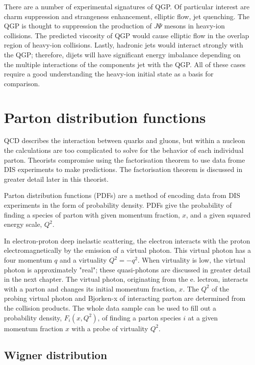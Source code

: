 There are a number of experimental signatures of QGP. Of particular interest are charm suppression and strangeness enhancement, elliptic flow, jet quenching. The QGP is thought to suppression the production of $J\Psi$ mesons in heavy-ion collisions. The predicted viscosity of QGP would cause elliptic flow in the overlap region of heavy-ion collisions. Lastly, hadronic jets would interact strongly with the QGP; therefore, dijets will have significant energy imbalance depending on the multiple interactions of the components jet with the QGP. All of these cases require a good understanding the heavy-ion initial state as a basis for comparison. 

\section{Parton distribution functions}

QCD describes the interaction between quarks and gluons, but within a nucleon the calculations are too complicated to solve for the behavior of each individual parton. Theorists compromise using the factorisation theorem to use data frome DIS experiments to make predictions. The factorisation theorem is discussed in greater detail later in this theorist.

Parton distribution functions (PDFs) are a method of encoding data from DIS experiments in the form of probability density. PDFs give the probability of finding a species of parton with given momentum fraction, $x$, and a given squared energy scale, $Q^2$.

In electron-proton deep inelastic scattering, the electron interacts with the proton electromagnetically by the emission of a virtual photon. This virtual photon has a four momentum $q$ and a virtuality $Q^2 = - q^2$. When virtuality is low, the virtual photon is approximately "real"; these quasi-photons are discussed in greater detail in the next chapter. The virtual photon, originating from the e. lectron, interacts with a parton and changes its initial momentum fraction, $x$. The $Q^2$ of the probing virtual photon and Bjorken-x of interacting parton are determined from the collision products. The whole data sample can be used to fill out a probability density, $F_i(x, Q^2)$, of finding a parton species $i$ at a given momentum fraction $x$ with a probe of virtuality $Q^2$.

\subsection{Wigner distribution}

